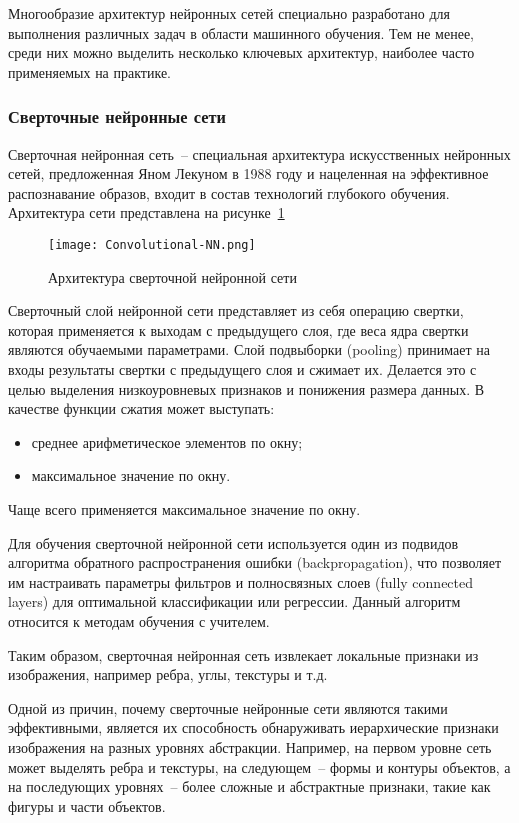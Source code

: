 Многообразие архитектур нейронных сетей специально разработано для выполнения различных задач в области машинного обучения. Тем не менее, среди них можно выделить несколько ключевых архитектур, наиболее часто применяемых на практике.

\subsubsection{Сверточные нейронные сети}

Сверточная нейронная сеть~-- специальная архитектура искусственных нейронных сетей, предложенная Яном Лекуном в 1988 году и нацеленная на эффективное распознавание образов, входит в состав технологий глубокого обучения. Архитектура сети представлена на рисунке~\ref{domain::convolutional-nn}

\begin{figure}[ht]
    \centering
    \texttt{[image: Convolutional-NN.png]}
    \caption{Архитектура сверточной нейронной сети}
    \label{domain::convolutional-nn}
\end{figure}

Сверточный слой нейронной сети представляет из себя операцию свертки, которая применяется к выходам с предыдущего слоя, где веса ядра свертки являются обучаемыми параметрами. Слой подвыборки (pooling) принимает на входы результаты свертки с предыдущего слоя и сжимает их. Делается это с целью выделения низкоуровневых признаков и понижения размера данных. В качестве функции сжатия может выступать:

\begin{itemize}
    \item среднее арифметическое элементов по окну;
    \item максимальное значение по окну.
\end{itemize}

Чаще всего применяется максимальное значение по окну. 

Для обучения сверточной нейронной сети используется один из подвидов алгоритма обратного распространения ошибки (backpropagation), что позволяет им настраивать параметры фильтров и полносвязных слоев (fully connected layers) для оптимальной классификации или регрессии. Данный алгоритм относится к методам обучения с учителем.

Таким образом, сверточная нейронная сеть извлекает локальные признаки из изображения, например ребра, углы, текстуры и т.д.

Одной из причин, почему сверточные нейронные сети являются такими эффективными, является их способность обнаруживать иерархические признаки изображения на разных уровнях абстракции. Например, на первом уровне сеть может выделять ребра и текстуры, на следующем~-- формы и контуры объектов, а на последующих уровнях~-- более сложные и абстрактные признаки, такие как фигуры и части объектов.

